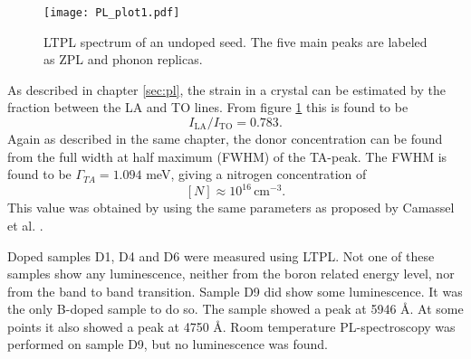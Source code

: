 \begin{figure}[h]
\begin{center}
\texttt{[image: PL\_plot1.pdf]}
\caption{LTPL spectrum of an undoped seed. The five main peaks are labeled as ZPL and phonon replicas. 
\label{fig:pl_spectrum1}}
\end{center}
\end{figure}

As described in chapter \ref{sec:pl}, the strain in a crystal can be estimated by the fraction between the LA and TO lines. From figure \ref{fig:pl_spectrum1} this is found to be 
\[I_\mathrm{LA}/I_\mathrm{TO} = 0.783.\]
Again as described in the same chapter, the donor concentration can be found from the full width at half maximum (FWHM) of the TA-peak. The FWHM is found to be $\Gamma_{TA} = 1.094$ meV, giving a nitrogen concentration of 
\[[N] \approx 10^{16} \, \mathrm{cm^{-3}}.\]
This value was obtained by using the same parameters as proposed by Camassel et al. \cite{Camassel2006}. 

Doped samples D1, D4 and D6 were measured using LTPL. Not one of these samples show any luminescence, neither from the boron related energy level, nor from the band to band transition. Sample D9 did show some luminescence. It was the only B-doped sample to do so. The sample showed a peak at 5946 Å. At some points it also showed a peak at 4750 Å. Room temperature PL-spectroscopy was performed on sample D9, but no luminescence was found. 

































